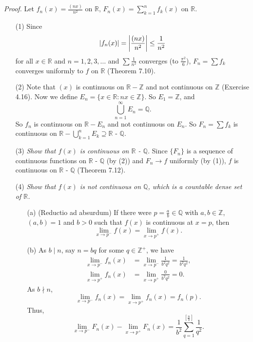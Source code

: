 \documentclass{article}
\begin{document}
\emph{Proof.}
Let $f_n(x) = \frac{(nx)}{n^2}$ on $\mathbb{R}$,
$F_n(x) = \sum_{k=1}^{n} f_k(x)$ on $\mathbb{R}$.
\begin{enumerate}
\item[(1)]
Since
\[
  \abs{f_n(x)} = \abs{ \frac{(nx)}{n^2} } \leq \frac{1}{n^2}
\]
for all $x \in \mathbb{R}$ and $n=1,2,3,\ldots$
and $\sum \frac{1}{n^2}$ converges (to $\frac{\pi^2}{6}$),
$F_n = \sum f_k$ converges uniformly to $f$ on $\mathbb{R}$ (Theorem 7.10).

\item[(2)]
Note that $(x)$ is continuous on $\mathbb{R} - \mathbb{Z}$
and not continuous on $\mathbb{Z}$ (Exercise 4.16).
Now we define $E_n = \{ x \in \mathbb{R} : nx \in \mathbb{Z}\}$.
So $E_1 = \mathbb{Z}$, and
\[
  \bigcup_{n=1}^{\infty} E_n = \mathbb{Q}.
\]
So $f_n$ is continuous on $\mathbb{R} - E_n$
and not continuous on $E_n$.
So $F_n = \sum f_k$ is continuous on
$\mathbb{R} - \bigcup_{k=1}^{n} E_k
\supseteq \mathbb{R}$ - $\mathbb{Q}$.

\item[(3)]
\emph{Show that $f(x)$ is continuous on $\mathbb{R}$ - $\mathbb{Q}$.}
Since
$\{F_n\}$ is a sequence of continuous functions on $\mathbb{R}$ - $\mathbb{Q}$ (by (2))
and $F_n \to f$ uniformly (by (1)),
$f$ is continuous on $\mathbb{R}$ - $\mathbb{Q}$ (Theorem 7.12).

\item[(4)]
\emph{Show that $f(x)$ is not continuous on $\mathbb{Q}$,
which is a countable dense set of $\mathbb{R}$.}
  \begin{enumerate}
  \item[(a)]
  (Reductio ad absurdum)
  If there were $p = \frac{a}{b} \in \mathbb{Q}$
  with $a,b \in \mathbb{Z}$, $(a,b) = 1$ and $b > 0$
  such that $f(x)$ is continuous at $x = p$,
  then
  \[
    \lim_{x \to p^{-}} f(x) = \lim_{x \to p^{+}} f(x).
  \]

  \item[(b)]
  As $b \mid n$, say $n = bq$ for some $q \in \mathbb{Z}^{+}$, we have
  \begin{align*}
    \lim_{x \to p^{-}} f_n(x)
    &= \lim_{x \to p^{-}} \frac{1}{b^2 q^2}
    = \frac{1}{b^2 q^2}, \\
    \lim_{x \to p^{+}} f_n(x)
    &= \lim_{x \to p^{+}} \frac{0}{b^2 q^2}
    = 0.
  \end{align*}
  As $b \nmid n$,
  \[
    \lim_{x \to p^{-}} f_n(x) = \lim_{x \to p^{+}} f_n(x) = f_n(p).
  \]
  Thus,
  \[
    \lim_{x \to p^{-}} F_n(x) - \lim_{x \to p^{+}} F_n(x)
    = \frac{1}{b^2} \sum_{q = 1}^{[\frac{n}{b}]} \frac{1}{q^2}.
  \]


\end{enumerate}
\end{enumerate}
\end{document}
